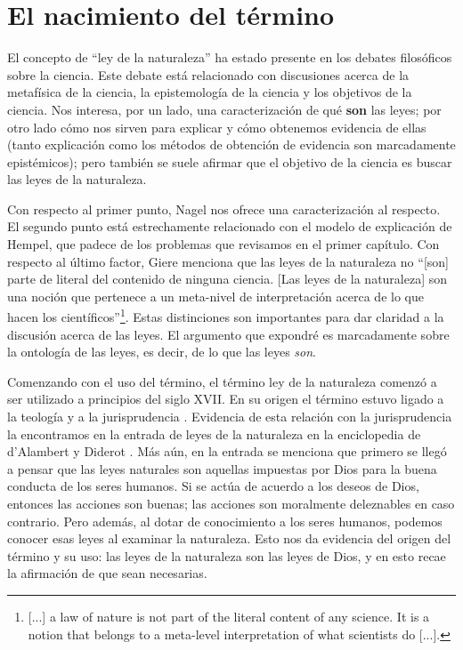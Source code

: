 \section{El nacimiento del término}

El concepto de ``ley de la naturaleza'' ha estado presente en los debates filosóficos sobre la ciencia. Este debate está relacionado con discusiones acerca de la metafísica de la ciencia, la epistemología de la ciencia y los objetivos de la ciencia. Nos interesa, por un lado, una caracterización de qué \textbf{son} las leyes; por otro lado cómo nos sirven para explicar y cómo obtenemos evidencia de ellas (tanto explicación como los métodos de obtención de evidencia son marcadamente epistémicos); pero también se suele afirmar que el objetivo de la ciencia es buscar las leyes de la naturaleza.

Con respecto al primer punto, Nagel nos ofrece una caracterización al respecto. El segundo punto está estrechamente relacionado con el modelo de explicación de Hempel, que padece de los problemas que revisamos en el primer capítulo. Con respecto al último factor, Giere \citeyear[p. 69]{Giere2006} menciona que las leyes de la naturaleza no ``[son] parte de literal del contenido de ninguna ciencia. [Las leyes de la naturaleza] son una noción que pertenece a un meta-nivel de interpretación acerca de lo que hacen los científicos''\footnote{[...] a law of nature is not part of the literal content of any science. It is a notion that belongs to a meta-level interpretation of what scientists do [...].}. Estas distinciones son importantes para dar claridad a la discusión acerca de las leyes. El argumento que expondré es marcadamente sobre la ontología de las leyes, es decir, de lo que las leyes \textit{son}.

Comenzando con el uso del término, el término ley de la naturaleza comenzó a ser utilizado a principios del siglo XVII. En su origen el término estuvo ligado a la teología y a la jurisprudencia \cite{Giere2006, Giere1999}. Evidencia de esta relación con la jurisprudencia la encontramos en la entrada de leyes de la naturaleza en la enciclopedia de d'Alambert y Diderot \cite{lawna}. Más aún, en la entrada se menciona que primero se llegó a pensar que las leyes naturales son aquellas impuestas por Dios para la buena conducta de los seres humanos. Si se actúa de acuerdo a los deseos de Dios, entonces las acciones son buenas; las acciones son moralmente deleznables en caso contrario. Pero además, al dotar de conocimiento a los seres humanos, podemos conocer esas leyes al examinar la naturaleza. Esto nos da evidencia del origen del término y su uso: las leyes de  la naturaleza son las leyes de Dios, y en esto recae la afirmación de que sean necesarias.

